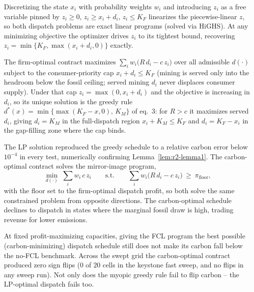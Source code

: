 Discretizing the state $x_i$ with probability weights $w_i$ and introducing $z_i$
as a free variable pinned by $z_i\ge0$, $z_i\ge x_i+d_i$, $z_i\le K_F$ linearizes
the piecewise-linear $z$, so both dispatch problems are exact linear programs
(solved via HiGHS). At any minimizing objective the optimizer drives $z_i$ to its
tightest bound, recovering $z_i=\min\{K_F,\max(x_i+d_i,0)\}$ exactly.

\begin{lemma}
\label{lem:r2-lemma1}
The firm-optimal contract maximizes $\sum_i w_i\bigl(R\,d_i-c\,z_i\bigr)$ over all
admissible $d(\cdot)$ subject to the consumer-priority cap $x_i+d_i\le K_F$ (mining
is served only into the headroom below the fossil ceiling; served mining $d_i$ never
displaces consumer supply). Under that cap $z_i=\max(0,x_i+d_i)$ and the objective is
increasing in $d_i$, so its unique solution is the greedy rule
$d^{*}(x)=\min\{\max(K_F-x,0),\,K_M\}$ of eq.~3: for $R>c$ it maximizes served $d_i$,
giving $d_i=K_M$ in the full-dispatch region $x_i+K_M\le K_F$ and $d_i=K_F-x_i$ in the
gap-filling zone where the cap binds.
\end{lemma}

The LP solution reproduced the greedy schedule to a relative carbon error below
$10^{-4}$ in every test, numerically confirming Lemma~\ref{lem:r2-lemma1}. The
carbon-optimal contract solves the mirror-image program,
\begin{equation}
\label{eq:r2-carbonlp}
\min_{d(\cdot)}\;\sum_i w_i\,c\,z_i
\qquad\text{s.t.}\qquad
\sum_i w_i\bigl(R\,d_i-c\,z_i\bigr)\ \ge\ \pi_{\text{floor}},
\end{equation}
with the floor set to the firm-optimal dispatch profit, so both solve the same
constrained problem from opposite directions. The carbon-optimal schedule
declines to dispatch in states where the marginal fossil draw is high, trading
revenue for lower emissions.

\begin{proposition}
\label{prop:r2-noflip}
At fixed profit-maximizing capacities, giving the FCL program the best possible
(carbon-minimizing) dispatch schedule still does not make its carbon fall below
the no-FCL benchmark. Across the swept grid the carbon-optimal contract produced
zero sign flips ($0$ of $20$ cells in the keystone fast sweep, and no flips in
any sweep run). Not only does the myopic greedy rule fail to flip carbon -- the
LP-optimal dispatch fails too.
\end{proposition}

